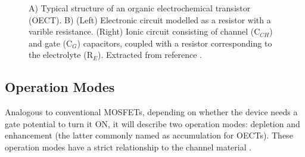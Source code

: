 \begin{figure}[h]
	\centering
	\hspace{2em}
	\caption[Typical OECT structure and circuit model]{A) Typical structure of an organic electrochemical transistor (OECT). B) (Left) Electronic circuit modelled as a resistor with a varible resistance. (Right) Ionic circuit consisting of channel (C$_{CH}$) and gate (C$_{G}$) capacitors, coupled with a resistor corresponding to the electrolyte (R$_{E}$). Extracted from reference \cite{rivnayOrganicElectrochemicalTransistors2018}.}
	\label{fig:bernard}
\end{figure}


\subsection{Operation Modes}

Analogous to conventional MOSFETs, depending on whether the device needs a gate potential to turn it ON, it will describe two operation modes: depletion and enhancement (the latter commonly named as accumulation for OECTs). These operation modes have a strict relationship to the channel material%
.


